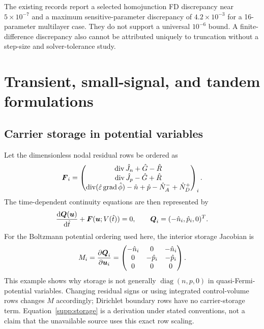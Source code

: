 \documentclass[11pt,a4paper]{article}
\numberwithin{equation}{section}
\begin{document}
The existing records report a selected homojunction FD discrepancy near
$5\times10^{-7}$ and a maximum sensitive-parameter discrepancy of
$4.2\times10^{-3}$ for a 16-parameter multilayer case. They do not
support a universal $10^{-6}$ bound. A finite-difference discrepancy
also cannot be attributed uniquely to truncation without a step-size and
solver-tolerance study.

\section{Transient, small-signal, and tandem formulations}\label{supp:auxiliary}
\subsection{Carrier storage in potential variables}
Let the dimensionless nodal residual rows be ordered as
\begin{equation}
\boldsymbol{F}_i=\begin{pmatrix}
\operatorname{div}\hat J_n+\hat G-\hat R\\
\operatorname{div}\hat J_p-\hat G+\hat R\\
\operatorname{div}(\hat\varepsilon\operatorname{grad}\hat\phi)
-\hat n+\hat p-\hat N_A^-+\hat N_D^+
\end{pmatrix}_i.
\end{equation}
The time-dependent continuity equations are then represented by
\begin{equation}
\frac{\mathrm{d}\boldsymbol Q(\boldsymbol{u})}{\mathrm{d}\hat t}+\boldsymbol{F}(\boldsymbol{u};V(\hat t))=0,
\qquad \boldsymbol Q_i=(-\hat n_i,\hat p_i,0)^T.
\end{equation}
For the Boltzmann potential ordering used here, the interior storage
Jacobian is
\begin{equation}
M_i=\frac{\partial\boldsymbol Q_i}{\partial\boldsymbol{u}_i}
=\begin{pmatrix}
-\hat n_i&0&-\hat n_i\\
0&-\hat p_i&-\hat p_i\\
0&0&0
\end{pmatrix}.
\label{supp:storage}
\end{equation}
This example shows why storage is not generally
$\operatorname{diag}(n,p,0)$ in quasi-Fermi-potential variables. Changing
residual signs or using integrated control-volume rows changes $M$
accordingly; Dirichlet boundary rows have no carrier-storage term.
Equation~\eqref{supp:storage} is a derivation under stated conventions,
not a claim that the unavailable source uses this exact row scaling.
\end{document}

